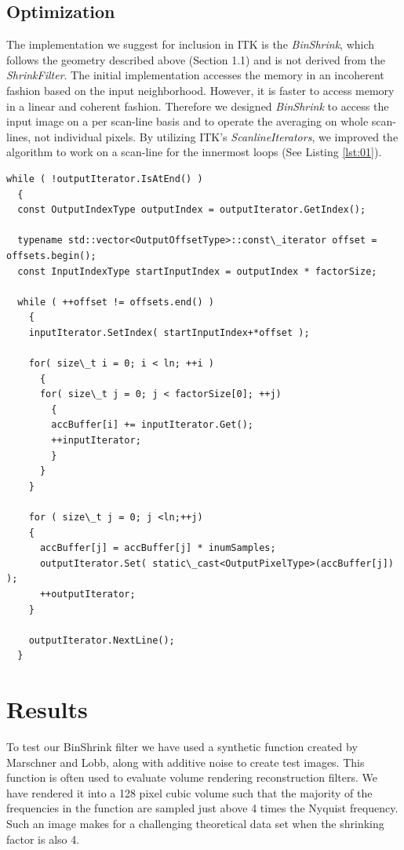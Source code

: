 \documentclass{InsightArticle}
\begin{document}
\subsection{Optimization}

The implementation we suggest for inclusion in ITK is the
\textit{BinShrink}, which follows the geometry described
above (Section 1.1) and is not derived from the \textit{ShrinkFilter}. The initial
implementation accesses the memory in an incoherent fashion based on
the input neighborhood. However, it is faster to access memory in a
linear and coherent fashion. Therefore we designed \textit{BinShrink}
to access the input image on a per scan-line basis and to operate the
averaging on whole scan-lines, not individual pixels. By utilizing ITK's
\textit{ScanlineIterators}, we improved the algorithm to work on a
scan-line for the innermost loops (See Listing \ref{lst:01}).

\begin{lstlisting}[label=lst:02, caption={A selection of code from the
  \textit{BinShrink} filter demonstrating scan-line averaging.}]
while ( !outputIterator.IsAtEnd() )
  {
  const OutputIndexType outputIndex = outputIterator.GetIndex();

  typename std::vector<OutputOffsetType>::const\_iterator offset = offsets.begin();
  const InputIndexType startInputIndex = outputIndex * factorSize;

  while ( ++offset != offsets.end() )
    {
    inputIterator.SetIndex( startInputIndex+*offset );

    for( size\_t i = 0; i < ln; ++i )
      {
      for( size\_t j = 0; j < factorSize[0]; ++j)
        {
        accBuffer[i] += inputIterator.Get();
        ++inputIterator;
        }
      }
    }

    for ( size\_t j = 0; j <ln;++j)
    {
      accBuffer[j] = accBuffer[j] * inumSamples;
      outputIterator.Set( static\_cast<OutputPixelType>(accBuffer[j]) );
      ++outputIterator;
    }

    outputIterator.NextLine();
  }
\end{lstlisting}

\section{Results}

To test our BinShrink filter we have used a synthetic function
created by Marschner and Lobb\cite{MarschnerL94}, along with additive
noise to create test images. This function is often used to
evaluate volume rendering reconstruction filters. We have rendered it
into a 128 pixel cubic volume such that the majority of the frequencies in
the function are sampled just above 4 times the Nyquist frequency. Such an image
makes for a challenging theoretical data set when the shrinking factor is also
4.
\end{document}
